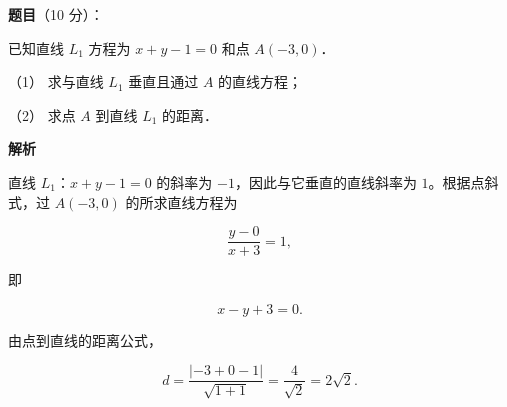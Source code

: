 \begin{answer}

\textbf{题目}（10 分）：

已知直线 $L_1$ 方程为 $x+y-1=0$ 和点 $A(-3,0)$．

（1） 求与直线 $L_1$ 垂直且通过 $A$ 的直线方程；

（2） 求点 $A$ 到直线 $L_1$ 的距离．

\textbf{解析}


直线 $L_1$：$x+y-1=0$ 的斜率为 $-1$，因此与它垂直的直线斜率为 $1$。根据点斜式，过 $A(-3,0)$ 的所求直线方程为

\nopagebreak[4]
\[
\frac{y-0}{x+3}=1,
\]

即

\nopagebreak[4]
\[
x-y+3=0.
\]


由点到直线的距离公式，

\nopagebreak[4]
\[
d=\frac{|-3+0-1|}{\sqrt{1+1}}
=\frac{4}{\sqrt2}
=2\sqrt2.
\]



\end{answer}
